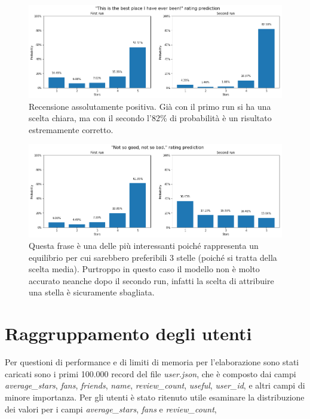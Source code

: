\documentclass[12pt]{article}
\begin{document}
\begin{figure}[H]
\centering
\includegraphics[width=\textwidth]{images/sent3.png}
\caption{Recensione assolutamente positiva. Già con il primo run si ha una scelta chiara, ma con il secondo l'82\% di probabilità è un risultato estremamente corretto.}
\label{fig:random_sentences_3}
\end{figure}

\begin{figure}[H]
\centering
\includegraphics[width=\textwidth]{images/sent4.png}
\caption{Questa frase è una delle più interessanti poiché rappresenta un equilibrio per cui sarebbero preferibili 3 stelle (poiché si tratta della scelta media). Purtroppo in questo caso il modello non è molto accurato neanche dopo il secondo run, infatti la scelta di attribuire una stella è sicuramente sbagliata.}
\label{fig:random_sentences_4}
\end{figure}


\section{Raggruppamento degli utenti}
\label{sec:users}
Per questioni di performance e di limiti di memoria per l'elaborazione sono stati caricati sono i primi 100.000 record del file \textit{user.json}, che è composto dai campi \textit{average\_stars}, \textit{fans}, \textit{friends}, \textit{name}, \textit{review\_count}, \textit{useful}, \textit{user\_id}, e altri campi di minore importanza. \newline
Per gli utenti è stato ritenuto utile esaminare la distribuzione dei valori per i campi \textit{average\_stars}, \textit{fans} e \textit{review\_count},
\end{document}
